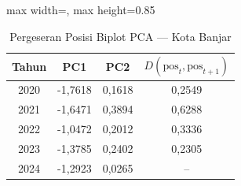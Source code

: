 \begin{table}[H]
\centering
\caption{Pergeseran Posisi Biplot PCA --- Kota Banjar} \label{tab:appjarak_pca_skor_kota_banjar}
\begin{adjustbox}{max width=\textwidth, max height=0.85\textheight}
\begin{tabular}{|c|c|c|c|}
\hline
\textbf{Tahun} & \textbf{PC1} & \textbf{PC2} & \textbf{$D(\text{pos}_t, \text{pos}_{t+1})$} \\
\hline
2020 & -1,7618 & 0,1618 & 0,2549 \\
2021 & -1,6471 & 0,3894 & 0,6288 \\
2022 & -1,0472 & 0,2012 & 0,3336 \\
2023 & -1,3785 & 0,2402 & 0,2305 \\
2024 & -1,2923 & 0,0265 & -- \\
\hline
\end{tabular}
\end{adjustbox}
\end{table}